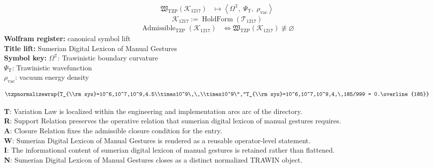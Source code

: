 \noindent
\begin{minipage}[t]{0.48\linewidth}
\begingroup
\small
\[
\begin{aligned}
\mathfrak{W}_{\mathrm{TZP}}\!\left(\mathcal{K}_{1217}\right)
&\longmapsto
\left\langle \Omega^{\mathbb{T}},\; \Psi_{\mathrm{T}},\; \rho_{\mathrm{vac}} \right\rangle
\end{aligned}
\]
\[
\mathcal{K}_{1217}
:=
\operatorname{HoldForm}\!\left(\mathcal{T}_{1217}\right)
\]
\[
\begin{aligned}
\operatorname{Admissible}_{\mathrm{TZP}}\!\left(\mathcal{K}_{1217}\right)
&\Longleftrightarrow
\mathfrak{W}_{\mathrm{TZP}}\!\left(\mathcal{K}_{1217}\right)\not\equiv\varnothing
\end{aligned}
\]
\textbf{Wolfram register:} canonical symbol lift\\
\textbf{Title lift:} Sumerian Digital Lexicon of Manual Gestures\\
\textbf{Symbol key:} \(\Omega^{\mathbb{T}}\): Trawinistic boundary curvature\\ \(\Psi_{\mathrm{T}}\): Trawinistic wavefunction\\ \(\rho_{\mathrm{vac}}\): vacuum energy density
\par
\endgroup
\end{minipage}\hfill
\begin{minipage}[t]{0.48\linewidth}
\[
\tzpnormalizewrap{T_{\\rm sys}=10^6,10^7,10^9,4.5\\times10^9\,\,\\times10^9\","T_{\\rm sys}=10^6,10^7,10^9,4,\,185/999 = 0.\overline{185}}
\]

\small
\textbf{T}: Variation Law is localized within the engineering and implementation arcs arc of the directory.\\
\textbf{R}: Support Relation preserves the operative relation that sumerian digital lexicon of manual gestures requires.\\
\textbf{A}: Closure Relation fixes the admissible closure condition for the entry.\\
\textbf{W}: Sumerian Digital Lexicon of Manual Gestures is rendered as a reusable operator-level statement.\\
\textbf{I}: The informational content of sumerian digital lexicon of manual gestures is retained rather than flattened.\\
\textbf{N}: Sumerian Digital Lexicon of Manual Gestures closes as a distinct normalized TRAWIN object.
\normalsize
\end{minipage}

